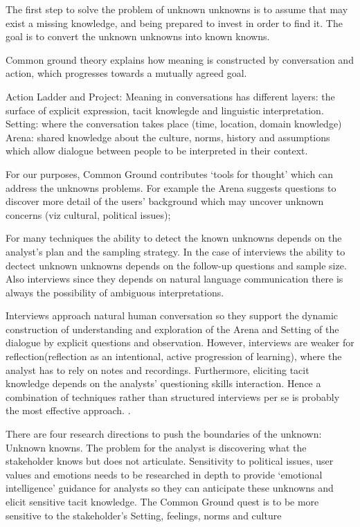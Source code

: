 \documentclass[]{llncs}
\begin{document}
The first step to solve the problem of unknown unknowns is to assume
that may exist a missing knowledge, and being prepared to invest in
order to find it. The goal is to convert the unknown unknowns into known
knowns.

Common ground theory explains how meaning is constructed by conversation
and action, which progresses towards a mutually agreed goal.

Action Ladder and Project: Meaning in conversations has different
layers: the surface of explicit expression, tacit knowlegde and
linguistic interpretation. Setting: where the conversation takes place
(time, location, domain knowledge) Arena: shared knowledge about the
culture, norms, history and assumptions which allow dialogue between
people to be interpreted in their context.

For our purposes, Common Ground contributes `tools for thought' which
can address the unknowns problems. For example the Arena suggests
questions to discover more detail of the users' background which may
uncover unknown concerns (viz cultural, political issues);

For many techniques the ability to detect the known unknowns depends on
the analyst's plan and the sampling strategy. In the case of interviews
the ability to dectect unknown unknowns depends on the follow-up
questions and sample size. Also interviews since they depends on natural
language communication there is always the possibility of ambiguous
interpretations.

Interviews approach natural human conversation so they support the
dynamic construction of understanding and exploration of the Arena and
Setting of the dialogue by explicit questions and observation. However,
interviews are weaker for reflection(reflection as an intentional,
active progression of learning), where the analyst has to rely on notes
and recordings. Furthermore, eliciting tacit knowledge depends on the
analysts' questioning skills interaction. Hence a combination of
techniques rather than structured interviews per se is probably the most
effective approach. .

There are four research directions to push the boundaries of the
unknown: Unknown knowns. The problem for the analyst is discovering what
the stakeholder knows but does not articulate. Sensitivity to political
issues, user values and emotions needs to be researched in depth to
provide `emotional intelligence' guidance for analysts so they can
anticipate these unknowns and elicit sensitive tacit knowledge. The
Common Ground quest is to be more sensitive to the stakeholder's
Setting, feelings, norms and culture
\end{document}
